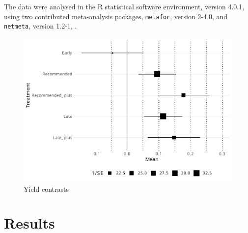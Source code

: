 \documentclass[agronomy,article,submit,moreauthors,pdftex]{mdpi}
\begin{document}
The data were analysed in the R statistical software environment, version 4.0.1, \citep{RCoreTeam2020} using two contributed meta-analysis packages, \texttt{metafor}, version 2-4.0, \citep{Viechtbauer2010} and \texttt{netmeta}, version 1.2-1, \citep{Rucker2020}.

\begin{figure}
\centering
\includegraphics{paper_files/figure-latex/Figure1-1.pdf}
\caption{\label{fig:Figure1}Yield contrasts}
\end{figure}

\hypertarget{results}{%
\section{Results}\label{results}}
\end{document}
